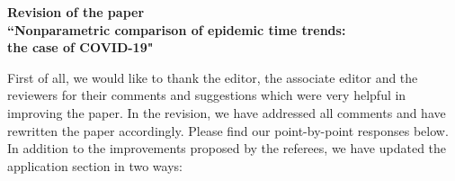 \documentclass[a4paper,12pt]{article}
\begin{document}
\begin{center} 
{\large \bf Revision of the paper} \\[0.1cm]
{\large \bf ``Nonparametric comparison of epidemic time trends:} \\[0.1cm]
{\large \bf the case of COVID-19"} 
\end{center}
\vspace{7pt}



First of all, we would like to thank the editor, the associate editor and the reviewers for their comments and suggestions which were very helpful in improving the paper. In the revision, we have addressed all comments and have rewritten the paper accordingly. Please find our point-by-point responses below. 
In addition to the improvements proposed by the referees, we have updated the application section in two ways: 
\end{document}

